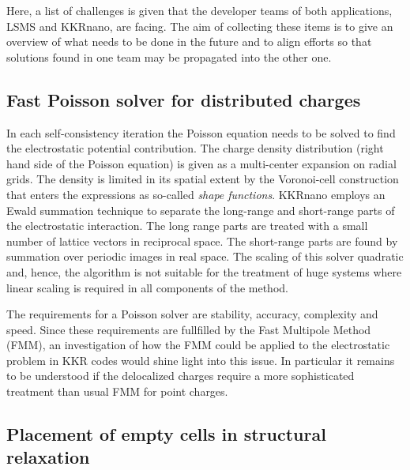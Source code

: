 \documentclass{llncs}
\def\KKRnano{{KKRnano}}
\def\LSMS{{LSMS}}
\begin{document}
Here, a list of challenges is given that the developer teams of both applications, \LSMS{} and \KKRnano{}, are
facing. The aim of collecting these items is to give an overview of what needs to be done in the future
and to align efforts so that solutions found in one team may be propagated into the other one.

\subsection{Fast Poisson solver for distributed charges} %
In each self-consistency iteration the Poisson equation needs to be solved to find the
electrostatic potential contribution. The charge density distribution (right hand side of the Poisson equation)
is given as a multi-center expansion on radial grids. The density is limited in its spatial extent
by the Voronoi-cell construction that enters the expressions as so-called \emph{shape functions}.
\KKRnano{} employs an Ewald summation technique to separate the long-range and short-range parts of the electrostatic interaction.
The long range parts are treated with a small number of lattice vectors in reciprocal space. The short-range parts
are found by summation over periodic images in real space.
The scaling of this solver quadratic  and, hence, the algorithm is not suitable
for the treatment of huge systems where linear scaling is required in all components of the method.

The requirements for a Poisson solver are stability, accuracy, complexity and speed.
Since these requirements are fullfilled by the Fast Multipole Method (FMM), 
an investigation of how the FMM could be applied to the
electrostatic problem in KKR codes would shine light into this issue.
In particular it remains to be understood if the delocalized charges require a more
sophisticated treatment than usual FMM for point charges.

\subsection{Placement of empty cells in structural relaxation} %
\end{document}
